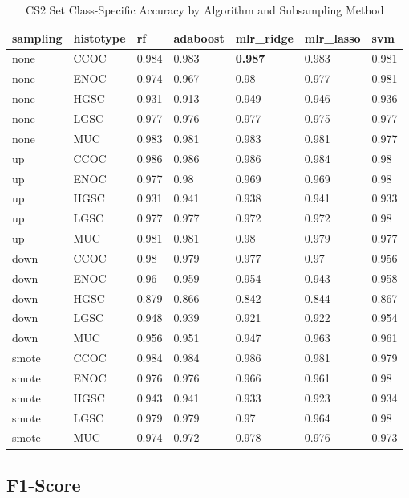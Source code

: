 \documentclass[
]{report}
\begin{document}
\begin{table}

\caption{\label{tab:cs2-accuracy-class-table}CS2 Set Class-Specific Accuracy by Algorithm and Subsampling Method}
\centering
\begin{tabular}[t]{l|l|l|l|l|l|l}
\hline
sampling & histotype & rf & adaboost & mlr\_ridge & mlr\_lasso & svm\\
\hline
none & CCOC & 0.984 & 0.983 & \textbf{0.987} & 0.983 & 0.981\\
\hline
none & ENOC & 0.974 & 0.967 & 0.98 & 0.977 & 0.981\\
\hline
none & HGSC & 0.931 & 0.913 & 0.949 & 0.946 & 0.936\\
\hline
none & LGSC & 0.977 & 0.976 & 0.977 & 0.975 & 0.977\\
\hline
none & MUC & 0.983 & 0.981 & 0.983 & 0.981 & 0.977\\
\hline
up & CCOC & 0.986 & 0.986 & 0.986 & 0.984 & 0.98\\
\hline
up & ENOC & 0.977 & 0.98 & 0.969 & 0.969 & 0.98\\
\hline
up & HGSC & 0.931 & 0.941 & 0.938 & 0.941 & 0.933\\
\hline
up & LGSC & 0.977 & 0.977 & 0.972 & 0.972 & 0.98\\
\hline
up & MUC & 0.981 & 0.981 & 0.98 & 0.979 & 0.977\\
\hline
down & CCOC & 0.98 & 0.979 & 0.977 & 0.97 & 0.956\\
\hline
down & ENOC & 0.96 & 0.959 & 0.954 & 0.943 & 0.958\\
\hline
down & HGSC & 0.879 & 0.866 & 0.842 & 0.844 & 0.867\\
\hline
down & LGSC & 0.948 & 0.939 & 0.921 & 0.922 & 0.954\\
\hline
down & MUC & 0.956 & 0.951 & 0.947 & 0.963 & 0.961\\
\hline
smote & CCOC & 0.984 & 0.984 & 0.986 & 0.981 & 0.979\\
\hline
smote & ENOC & 0.976 & 0.976 & 0.966 & 0.961 & 0.98\\
\hline
smote & HGSC & 0.943 & 0.941 & 0.933 & 0.923 & 0.934\\
\hline
smote & LGSC & 0.979 & 0.979 & 0.97 & 0.964 & 0.98\\
\hline
smote & MUC & 0.974 & 0.972 & 0.978 & 0.976 & 0.973\\
\hline
\end{tabular}
\end{table}

\hypertarget{f1-score-2}{%
\subsection{F1-Score}\label{f1-score-2}}
\end{document}
